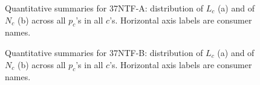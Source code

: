 \documentclass[journal, a4paper]{IEEEtran}
\begin{document}
\begin{figure}[t!]
	\centering
	\caption{
		Quantitative summaries for 37NTF-A:
		distribution of $L_{c}$ (a) and of $N_{c}$ (b)
		across all $p_{c}$'s in all $c$'s.
		Horizontal axis labels are consumer names.
	}
	\label{fig: Quantitative summaries for 37NTF-A}
\end{figure}

\begin{figure}[t!]
	\centering
	\caption{
		Quantitative summaries for 37NTF-B:
		distribution of $L_{c}$ (a) and of $N_{c}$ (b)
		across all $p_{c}$'s in all $c$'s.
		Horizontal axis labels are consumer names.
	}
	\label{fig: Quantitative summaries for 37NTF-B}
\end{figure}
\end{document}
